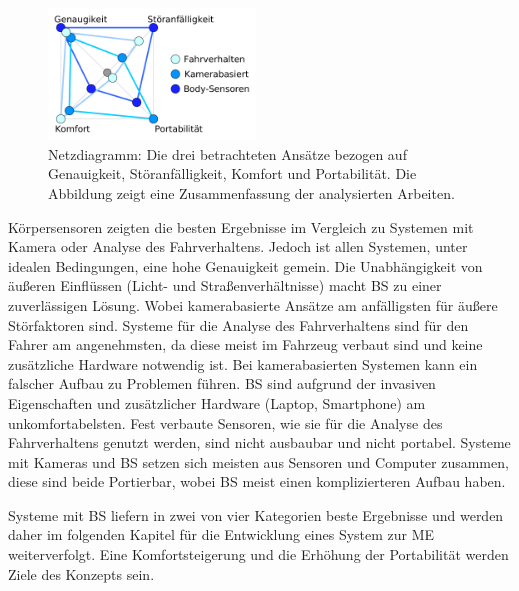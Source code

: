 {\begin{figure}[h] 
  \begin{center}
    \includegraphics[width=5.5cm]{img/analysis}
    \caption{ Netzdiagramm: Die drei betrachteten Ansätze bezogen auf Genauigkeit, Störanfälligkeit, Komfort und Portabilität. Die Abbildung zeigt eine Zusammenfassung der analysierten Arbeiten.}
    \label{fig:analysis}
  \end{center}
\end{figure}

Körpersensoren zeigten die besten Ergebnisse im Vergleich zu Systemen mit Kamera oder Analyse des Fahrverhaltens. Jedoch ist allen Systemen, unter idealen Bedingungen, eine hohe Genauigkeit gemein.
Die Unabhängigkeit von äußeren Einflüssen (Licht- und Straßenverhältnisse) macht \acl{BS} zu einer zuverlässigen Lösung. Wobei kamerabasierte Ansätze am anfälligsten für äußere Störfaktoren sind. 
Systeme für die Analyse des Fahrverhaltens sind für den Fahrer am angenehmsten, da diese meist im Fahrzeug verbaut sind und keine zusätzliche Hardware notwendig ist. Bei kamerabasierten Systemen kann ein falscher Aufbau zu Problemen führen. \acl{BS} sind aufgrund der invasiven Eigenschaften und zusätzlicher Hardware (Laptop, Smartphone) am unkomfortabelsten. 
Fest verbaute Sensoren, wie sie für die Analyse des Fahrverhaltens genutzt werden, sind nicht ausbaubar und nicht portabel. Systeme mit Kameras und \acl{BS} setzen sich meisten aus Sensoren und Computer zusammen, diese sind beide Portierbar, wobei \acl{BS} meist einen komplizierteren Aufbau haben.

Systeme mit \acl{BS} liefern in zwei von vier Kategorien beste Ergebnisse und werden daher im folgenden Kapitel für die Entwicklung eines System zur \acl{ME} weiterverfolgt. Eine Komfortsteigerung und die Erhöhung der Portabilität werden Ziele des Konzepts sein.

}
